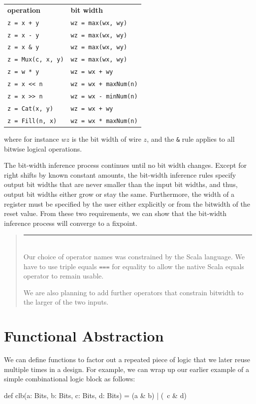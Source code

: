 \documentclass[twocolumn,10pt]{article}
\newenvironment{commentary}
{ \vspace{-0.1in}
  \begin{quotation}
  \noindent
  \small \em
  \rule{\linewidth}{1pt}\\
}
{
  \end{quotation}
}
\def\code#1{{\tt #1}}
\begin{document}
\begin{tabular}{ll}
{\bf operation} & {\bf bit width} \\ 
\verb|z = x + y| & \verb|wz = max(wx, wy)| \\
\verb+z = x - y+ & \verb|wz = max(wx, wy)|\\
\verb+z = x & y+ & \verb+wz = max(wx, wy)+ \\
\verb+z = Mux(c, x, y)+ & \verb+wz = max(wx, wy)+ \\
\verb+z = w * y+ & \verb!wz = wx + wy! \\
\verb+z = x << n+ & \verb!wz = wx + maxNum(n)! \\
\verb+z = x >> n+ & \verb+wz = wx - minNum(n)+ \\
\verb+z = Cat(x, y)+ & \verb!wz = wx + wy! \\
\verb+z = Fill(n, x)+ & \verb+wz = wx * maxNum(n)+ \\
\end{tabular}

\noindent
where for instance $wz$ is the bit width of wire $z$, and the \verb+&+
rule applies to all bitwise logical operations.

The bit-width inference process continues until no bit width changes.
Except for right shifts by known constant amounts, the bit-width
inference rules specify output bit widths that are never smaller than
the input bit widths, and thus, output bit widths either grow or stay
the same.  Furthermore, the width of a register must be specified by
the user either explicitly or from the bitwidth of the reset value.
From these two requirements, we can show that the bit-width inference
process will converge to a fixpoint.

\begin{commentary}
Our choice of operator names was constrained by the Scala language.
We have to use triple equals \code{===} for equality to allow the
native Scala equals operator to remain usable.

We are also planning to add further operators that constrain bitwidth
to the larger of the two inputs.
\end{commentary}

\section{Functional Abstraction}

We can define functions to factor out a repeated piece of logic that
we later reuse multiple times in a design.  For example, we can wrap
up our earlier example of a simple combinational logic block as
follows:
\begin{scala}
def clb(a: Bits, b: Bits, c: Bits, d: Bits) = 
  (a & b) | (~c & d)
\end{scala}
\end{document}
